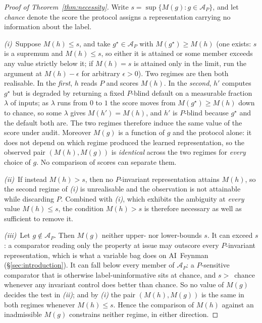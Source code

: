 \begin{proof}[Proof of Theorem~\ref{thm:necessity}]
Write $s=\sup\{M(g):g\in\mathcal{A}_P\}$, and let \emph{chance} denote the score the protocol assigns a representation carrying no information about the label.

\emph{(i)}~Suppose $M(h)\leq s$, and take $g^\star\in\mathcal{A}_P$ with $M(g^\star)\geq M(h)$ (one exists: $s$ is a supremum and $M(h)\leq s$, so either it is attained or some member exceeds any value strictly below it; if $M(h)=s$ is attained only in the limit, run the argument at $M(h)-\epsilon$ for arbitrary $\epsilon>0$). Two regimes are then both realisable. In the \emph{first}, $h$ reads $P$ and scores $M(h)$. In the \emph{second}, $h'$ computes $g^\star$ but is degraded by returning a fixed $P$-blind default on a measurable fraction $\lambda$ of inputs; as $\lambda$ runs from $0$ to $1$ the score moves from $M(g^\star)\geq M(h)$ down to chance, so some $\lambda$ gives $M(h')=M(h)$, and $h'$ is $P$-blind because $g^\star$ and the default both are. The two regimes therefore induce the same value of the score under audit. Moreover $M(g)$ is a function of $g$ and the protocol alone: it does not depend on which regime produced the learned representation, so the observed pair $(M(h),M(g))$ is \emph{identical} across the two regimes for \emph{every} choice of $g$. No comparison of scores can separate them.

\emph{(ii)}~If instead $M(h)>s$, then no $P$-invariant representation attains $M(h)$, so the second regime of \emph{(i)} is unrealisable and the observation is not attainable while discarding $P$. Combined with \emph{(i)}, which exhibits the ambiguity at \emph{every} value $M(h)\leq s$, the condition $M(h)>s$ is therefore necessary as well as sufficient to remove it.

\emph{(iii)}~Let $g\notin\mathcal{A}_P$. Then $M(g)$ neither upper- nor lower-bounds $s$. It can exceed $s$: a comparator reading only the property at issue may outscore every $P$-invariant representation, which is what a variable bag does on AI~Feynman (\S\ref{sec:introduction}). It can fall below every member of $\mathcal{A}_P$: a $P$-sensitive comparator that is otherwise label-uninformative sits at chance, and $s>$~chance whenever any invariant control does better than chance. So no value of $M(g)$ decides the test in \emph{(ii)}; and by \emph{(i)} the pair $(M(h),M(g))$ is the same in both regimes whenever $M(h)\leq s$. Hence the comparison of $M(h)$ against an inadmissible $M(g)$ constrains neither regime, in either direction.
\end{proof}

